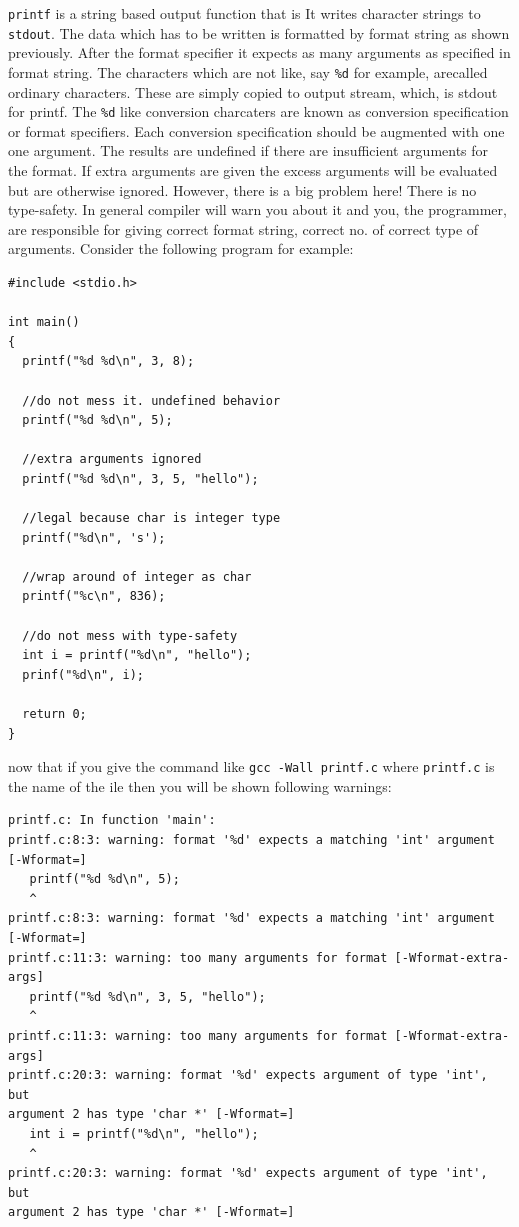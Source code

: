 \texttt{printf} is a string based output function that is It writes character
strings to \texttt{stdout}. The data which has to be written is formatted by
format string as shown previously. After the format specifier it expects as
many arguments as specified in format string. The characters which are not
like, say \texttt{\%d} for example, arecalled ordinary characters. These are
simply copied to output stream, which, is stdout for printf. The \texttt{\%d}
like conversion charcaters are known as conversion specification or format
specifiers. Each conversion specification should be augmented with one one
argument. The results are undefined if there are insufficient arguments for the
format. If extra arguments are given the excess arguments will be evaluated but
are otherwise ignored. However, there is a big problem here! There is no
type-safety. In general compiler will warn you about it and you, the
programmer, are responsible for giving correct format string, correct no. of
correct type of arguments. Consider the following program for example:

\begin{verbatim}
#include <stdio.h>

int main()
{
  printf("%d %d\n", 3, 8);

  //do not mess it. undefined behavior
  printf("%d %d\n", 5);

  //extra arguments ignored
  printf("%d %d\n", 3, 5, "hello");

  //legal because char is integer type
  printf("%d\n", 's');

  //wrap around of integer as char
  printf("%c\n", 836);

  //do not mess with type-safety
  int i = printf("%d\n", "hello");
  prinf("%d\n", i);

  return 0;
}
\end{verbatim}

now that if you give the command like \texttt{gcc -Wall printf.c} where
\texttt{printf.c} is the name of the ile then you will be shown following
warnings:

\begin{verbatim}
printf.c: In function 'main':
printf.c:8:3: warning: format '%d' expects a matching 'int' argument [-Wformat=]
   printf("%d %d\n", 5);
   ^
printf.c:8:3: warning: format '%d' expects a matching 'int' argument [-Wformat=]
printf.c:11:3: warning: too many arguments for format [-Wformat-extra-args]
   printf("%d %d\n", 3, 5, "hello");
   ^
printf.c:11:3: warning: too many arguments for format [-Wformat-extra-args]
printf.c:20:3: warning: format '%d' expects argument of type 'int', but
argument 2 has type 'char *' [-Wformat=]
   int i = printf("%d\n", "hello");
   ^
printf.c:20:3: warning: format '%d' expects argument of type 'int', but
argument 2 has type 'char *' [-Wformat=]
\end{verbatim}

